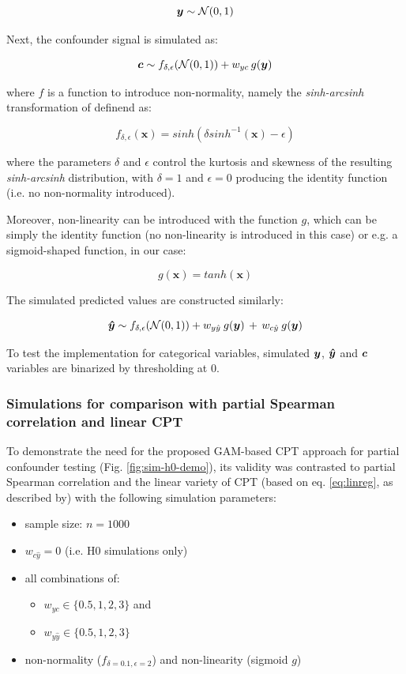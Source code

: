 \documentclass{article}
\begin{document}
$$ \boldsymbol{y} \sim \mathcal{N}(0, 1) $$

Next, the confounder signal is simulated as:

$$ \boldsymbol{c} \sim f_{\delta, \epsilon}(\mathcal{N}(0, 1)) + w_{yc} \, g(\boldsymbol{y}) $$

where $f$ is a function to introduce non-normality, namely the \emph{sinh-arcsinh} transformation of\cite{jones2009sinh} definend as:

$$f_{\delta, \epsilon}(\boldsymbol{x}) = sinh(\delta sinh^{-1}(\boldsymbol{x}) - \epsilon)$$

where the parameters $\delta$ and $\epsilon$ control the kurtosis and skewness of the resulting \emph{sinh-arcsinh} distribution, with $\delta=1$ and $\epsilon=0$ producing the identity function (i.e. no non-normality introduced).

Moreover, non-linearity can be introduced with the function $g$, which can be simply the identity function (no non-linearity is introduced in this case) or e.g. a sigmoid-shaped function, in our case:

$$ g(\boldsymbol{x}) = tanh(\boldsymbol{x}) $$


The simulated predicted values are constructed similarly:

$$ \boldsymbol{\hat{y}} \sim f_{\delta, \epsilon}(\mathcal{N}(0, 1)) + w_{y\hat{y}} \: g(\boldsymbol{y}) \, + \, w_{c\hat{y}} \: g(\boldsymbol{y})$$

To test the implementation for categorical variables, simulated $\boldsymbol{y}$, $\boldsymbol{\hat{y}}$ and $\boldsymbol{c}$ variables are binarized by thresholding at 0.

\subsubsection*{Simulations for comparison with partial Spearman correlation and linear CPT}

To demonstrate the need for the proposed GAM-based CPT approach for partial confounder testing (Fig. \ref{fig:sim-h0-demo}), its validity was contrasted to partial Spearman correlation and the linear variety of CPT (based on eq. \ref{eq:linreg}, as described by\cite{berrett2020conditional}) with the following simulation parameters:
\begin{itemize}
    \item sample size: $n = 1000$
    \item $w_{c\hat{y}} = 0$ (i.e. H0 simulations only)
    \item all combinations of:
    \begin{itemize}
        \item $w_{yc} \in \{0.5, 1, 2, 3\}$ and
        \item $w_{y\hat{y}} \in \{0.5, 1, 2, 3\}$
    \end{itemize}
    \item non-normality ($f_{\delta = 0.1, \epsilon = 2}$) and non-linearity (sigmoid $g$)
\end{itemize}
\end{document}
